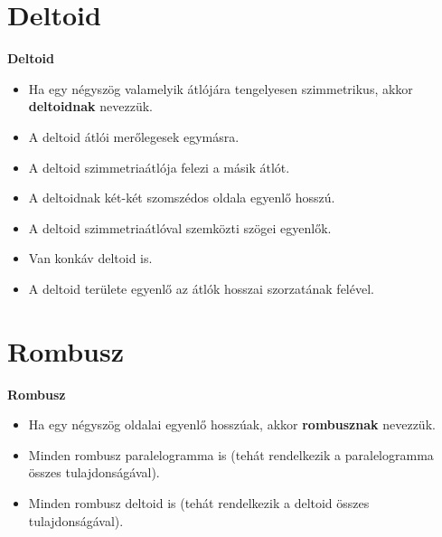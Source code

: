 \documentclass[11pt]{beamer}
\begin{document}
\section{\textbf{Deltoid}}
\begin{frame}[<+->]
\begin{block}{\textbf{Deltoid}}
\begin{itemize}[label=$\circ$]
\item Ha egy négyszög valamelyik átlójára tengelyesen szimmetrikus, akkor \textbf{deltoidnak} nevezzük.
\item A deltoid átlói merőlegesek egymásra.
\item A deltoid szimmetriaátlója felezi a másik átlót.
\item A deltoidnak két-két szomszédos oldala egyenlő hosszú.
\item A deltoid szimmetriaátlóval szemközti szögei egyenlők.
\item Van konkáv deltoid is.
\item A deltoid területe egyenlő az átlók hosszai szorzatának felével.
\end{itemize}
\end{block}
\end{frame}

\section{\textbf{Rombusz}}
\begin{frame}[<+->]
\begin{block}{\textbf{Rombusz}}
\begin{itemize}[label=$\circ$]
\item Ha egy négyszög oldalai egyenlő hosszúak, akkor \textbf{rombusznak} nevezzük.
\item Minden rombusz paralelogramma is (tehát rendelkezik a paralelogramma összes tulajdonságával).
\item Minden rombusz deltoid is (tehát rendelkezik a deltoid összes tulajdonságával).
\end{itemize}
\end{block}
\end{frame}
\end{document}
